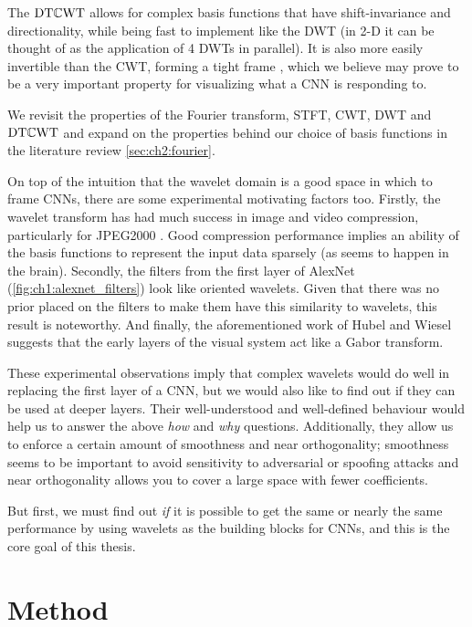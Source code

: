 The $\mathrm{DT}\mathbb{C}\mathrm{WT}$ allows for complex basis functions that have shift-invariance and
directionality, while being fast to implement like the DWT (in 2-D it can be thought of as the
application of 4 DWTs in parallel). It is also more easily invertible than the
CWT, forming a tight frame \cite{kovacevic_introduction_2008}, which we believe
may prove to be a very important property for visualizing what a
CNN is responding to.

We revisit the properties of the Fourier transform, STFT, CWT, DWT and $\mathrm{DT}\mathbb{C}\mathrm{WT}$
and expand on the properties behind our choice of basis functions
in the literature review \autoref{sec:ch2:fourier}.

On top of the intuition that the wavelet domain is a good space in which to frame CNNs,
there are some experimental motivating factors too. Firstly, the wavelet
transform has had much success in image and video compression, particularly for
JPEG2000 \cite{taubman_jpeg2000_2013}. Good compression performance implies an ability of
the basis functions to represent the input data sparsely (as seems to happen in
the brain). Secondly, the filters from the first layer of AlexNet
(\autoref{fig:ch1:alexnet_filters}) look like oriented wavelets. Given that
there was no prior placed on the filters to make them have this similarity to
wavelets, this result is noteworthy. And finally, the aforementioned work of
Hubel and Wiesel suggests that the early layers of the visual system act like a
Gabor transform.

These experimental observations imply that complex wavelets would do well in
replacing the first layer of a CNN, but we would also like to find out if they can be used
at deeper layers. Their well-understood and well-defined behaviour would help us
to answer the above \emph{how} and \emph{why} questions. Additionally, they
allow us to enforce a certain amount of smoothness and near orthogonality;
smoothness seems to be important to avoid sensitivity to adversarial or spoofing
attacks \cite{szegedy_intriguing_2014} and near orthogonality allows you to
cover a large space with fewer coefficients.

But first, we must find out \emph{if} it is possible to get the same or nearly the same
performance by using wavelets as the building blocks for CNNs, and this is the
core goal of this thesis.

\section{Method}
